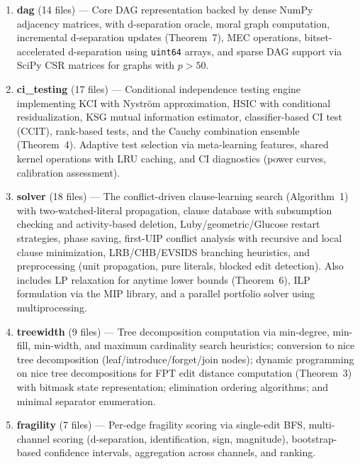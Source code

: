 \documentclass[11pt,a4paper]{article}
\theoremstyle{definition}
\theoremstyle{remark}
\begin{document}
\begin{enumerate}
  \item \textbf{dag} (14 files) --- Core DAG representation backed by dense NumPy
    adjacency matrices, with d-separation oracle, moral graph computation,
    incremental d-separation updates (Theorem~7), MEC operations, bitset-accelerated
    d-separation using \texttt{uint64} arrays, and sparse DAG support via SciPy CSR
    matrices for graphs with $p > 50$.

  \item \textbf{ci\_testing} (17 files) --- Conditional independence testing engine
    implementing KCI with Nystr\"om approximation, HSIC with conditional
    residualization, KSG mutual information estimator, classifier-based CI test
    (CCIT), rank-based tests, and the Cauchy combination ensemble
    (Theorem~4). Adaptive test selection via meta-learning features, shared
    kernel operations with LRU caching, and CI diagnostics (power curves,
    calibration assessment).

  \item \textbf{solver} (18 files) --- The conflict-driven clause-learning search
    (Algorithm~1) with two-watched-literal propagation, clause database with
    subsumption checking and activity-based deletion, Luby/geometric/Glucose
    restart strategies, phase saving, first-UIP conflict analysis with recursive
    and local clause minimization, LRB/CHB/EVSIDS branching heuristics, and
    preprocessing (unit propagation, pure literals, blocked edit detection).
    Also includes LP relaxation for anytime lower bounds (Theorem~6), ILP
    formulation via the MIP library, and a parallel portfolio solver using
    multiprocessing.

  \item \textbf{treewidth} (9 files) --- Tree decomposition computation via
    min-degree, min-fill, min-width, and maximum cardinality search heuristics;
    conversion to nice tree decomposition (leaf/introduce/forget/join nodes);
    dynamic programming on nice tree decompositions for FPT edit distance
    computation (Theorem~3) with bitmask state representation; elimination
    ordering algorithms; and minimal separator enumeration.

  \item \textbf{fragility} (7 files) --- Per-edge fragility scoring via
    single-edit BFS, multi-channel scoring (d-separation, identification,
    sign, magnitude), bootstrap-based confidence intervals, aggregation across
    channels, and ranking.


\end{enumerate}
\end{document}
